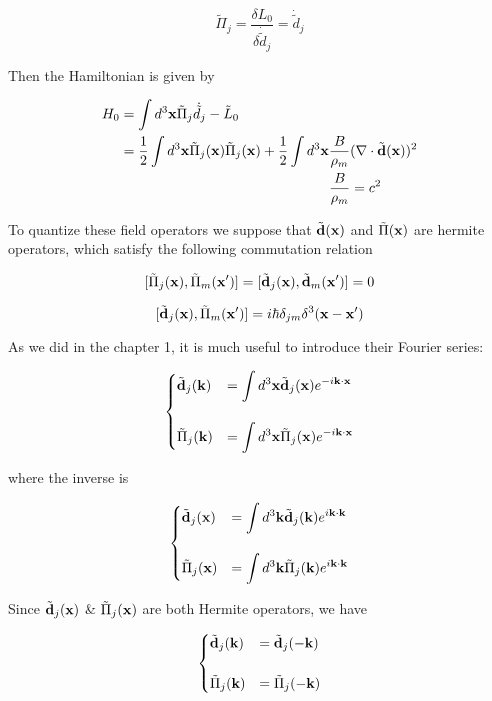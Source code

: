\[\tilde{\Pi}_j = \frac{\delta L_0}{\delta\dot{\tilde{d}}_j} = \dot{\tilde{d}}_j \]

Then the Hamiltonian is given by

\[\begin{split}
H_0 &= \int d^3{\bf x}\tilde{\Pi}_j\dot{\tilde{d}}_j - \tilde{L}_0\\
 &=\frac{1}{2}\int d^3{\bf x}\tilde{\Pi}_j({\bf x})\tilde{\Pi}_j({\bf x}) + \frac{1}{2}\int d^3{\bf x}\frac{B}{\rho_m}(\nabla\cdot\tilde{\bf d}{\bf(x)})^2\\
 & \quad\quad\quad\quad\quad\quad\quad\quad\quad\quad\quad\quad\quad\quad\quad \frac{B}{\rho_m} = c^2
\end{split}\]

To quantize these field operators we suppose that $\tilde{\bf d}(\bf x)$ and $\tilde{\Pi}(\bf x)$ are hermite operators, which satisfy the following commutation relation

\[[\tilde{\Pi}_j({\bf x}),\tilde{\Pi}_m({\bf x'})] = [\tilde{\bf d}_j({\bf x}),\tilde{\bf d}_m({\bf x'})] = 0 \]

\[[\tilde{\bf d}_j({\bf x}), \tilde{\Pi}_m({\bf x'})] = i\hbar\delta_{jm}\delta^3(\bf x-x') \]

As we did in the chapter 1, it is much useful to introduce their Fourier series:

\[\begin{cases}
\tilde{\bf d}_j({\bf k}) &= \displaystyle\int d^3{\bf x}\tilde{\bf d}_j({\bf x}) e^{-i\bf k\cdot x}\\
\ & \\
\tilde{\Pi}_j({\bf k}) &= \displaystyle\int d^3 {\bf x} \tilde{\Pi}_j({\bf x}) e^{-i\bf k\cdot x}
\end{cases}\]

where the inverse is

\[\begin{cases}
\tilde{\bf d}_j({\bf x}) &= \displaystyle\int d^3{\bf k}\tilde{\bf d}_j({\bf k}) e^{i\bf k\cdot k}\\
\ & \\
\tilde{\Pi}_j({\bf x}) &= \displaystyle\int d^3 {\bf k} \tilde{\Pi}_j({\bf k}) e^{i\bf k\cdot k}
\end{cases}\]

Since $\tilde{\bf d}_j({\bf x})$ \& $\tilde{\Pi}_j({\bf x})$ are both Hermite operators, we have

\[\begin{cases}
\tilde{\bf d}_j({\bf k}) &= \tilde{\bf d}_j({-\bf k})\\
\ & \\
\tilde{\Pi}_j({\bf k}) &= \tilde{\Pi}_j(-\bf k)
\end{cases}\]

